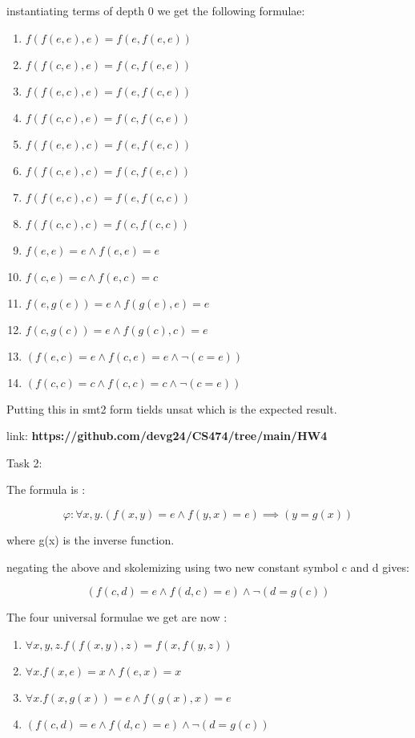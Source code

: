 \documentclass[12pt]{article}
\begin{document}
instantiating terms of depth 0 we get the following formulae:
\begin{enumerate}
    \item $f(f(e,e),e) = f(e,f(e,e))$
    \item $f(f(c,e),e) = f(c,f(e,e))$
    \item $f(f(e,c),e) = f(e,f(c,e))$
    \item $f(f(c,c),e) = f(c,f(c,e))$
    \item $f(f(e,e),c) = f(e,f(e,c))$
    \item $f(f(c,e),c) = f(c,f(e,c))$
    \item $f(f(e,c),c) = f(e,f(c,c))$
    \item $f(f(c,c),c) = f(c,f(c,c))$
    \item $f(e,e) = e \land f(e,e) = e$
    \item $f(c,e) = c \land f(e,c) = c$
    \item $f(e , g(e)) = e \land f(g(e),e) = e$
    \item $f(c , g(c)) = e \land f(g(c),c) = e$
    \item $(f(e,c) = e \land f(c,e) = e \land \neg (c = e))$
    \item $(f(c,c) = c \land f(c,c) = c \land \neg (c = e))$
\end{enumerate}

Putting this in smt2 form tields unsat which is the expected result.

link: \textbf{https://github.com/devg24/CS474/tree/main/HW4}

\noindent Task 2:

The formula is :

\begin {equation}
\varphi : \forall x, y. (f(x,y) = e \land f(y,x) = e) \implies (y = g(x))
\end {equation}

where g(x) is the inverse function.

negating the above and skolemizing using two new constant symbol c and d gives:

$$(f(c,d) = e \land f(d,c) = e) \land \neg(d = g(c))$$

The four universal formulae we get are now :

\begin{enumerate}
    \item $\forall x,y,z. f(f(x,y),z) = f(x,f(y,z))$
    \item $\forall x. f(x,e) = x \land f(e,x) = x$
    \item $\forall x. f(x , g(x)) = e \land f(g(x),x) = e$
    \item $(f(c,d) = e \land f(d,c) = e) \land \neg(d = g(c))$
\end{enumerate}
\end{document}
